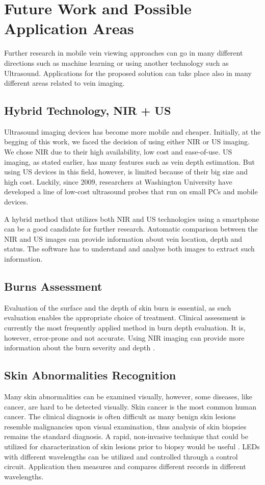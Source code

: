 \section{Future Work and Possible Application Areas}
Further research in mobile vein viewing approaches can go in many different directions such as machine learning or using another technology such as Ultrasound. Applications for the proposed solution can take place also in many different areas related to vein imaging.

\subsection{Hybrid Technology, NIR + US}
Ultrasound imaging devices has become more mobile and cheaper. Initially, at the begging of this work, we faced the decision of using either NIR or US imaging. We chose NIR due to their high availability, low cost and ease-of-use. US imaging, as stated earlier, has many features such as vein depth estimation. But using US devices in this field, however, is limited because of their big size and high cost. Luckily, since 2009, researchers at Washington University have developed a line of low-cost ultrasound probes that run on small PCs and mobile devices. 


A hybrid method that utilizes both NIR and US technologies using a smartphone can be a good candidate for further research. Automatic comparison between the NIR and US images can provide information about vein location, depth and status. The software has to understand and analyse both images to extract such information.


\subsection{Burns Assessment}

Evaluation of the surface and the depth of skin burn is essential, as such evaluation enables the appropriate choice of treatment. Clinical assessment is currently the most frequently applied method in burn depth evaluation. It is, however, error-prone and not accurate. Using NIR imaging can provide more information about the burn severity and depth \parencite{burn}.

\subsection{Skin Abnormalities Recognition}

Many skin abnormalities can be examined visually, however, some diseases, like cancer, are hard to be detected visually. Skin cancer is the most common human cancer. The clinical diagnosis is often difficult as many benign skin lesions resemble malignancies upon visual examination, thus analysis of skin biopsies remains the standard diagnosis. A rapid, non-invasive technique that could be utilized for characterization of skin lesions prior to biopsy would be useful \parencite{skinCancer}.
LEDs with different wavelengths can be utilized and controlled through a control circuit. Application then measures and compares different records in different wavelengths.

